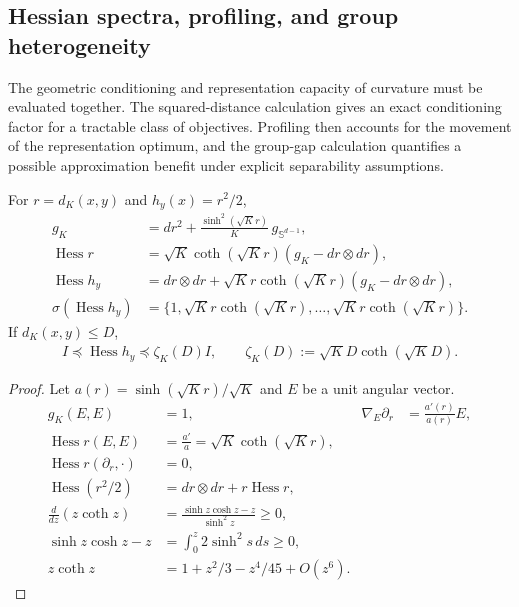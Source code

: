 \subsection{Hessian spectra, profiling, and group heterogeneity}
The geometric conditioning and representation capacity of curvature must be evaluated together. The squared-distance calculation gives an exact conditioning factor for a tractable class of objectives. Profiling then accounts for the movement of the representation optimum, and the group-gap calculation quantifies a possible approximation benefit under explicit separability assumptions.
\begin{proposition}
\label{prop:squared-hessian}
For $r=d_K(x,y)$ and $h_y(x)=r^2/2$,
\begin{align}
 g_K&=dr^2+\frac{\sinh^2(\sqrt Kr)}K\,g_{\mathbb S^{d-1}},\\
 \operatorname{Hess}r
 &=\sqrt K\coth(\sqrt Kr)(g_K-dr\otimes dr),\\
 \operatorname{Hess}h_y
 &=dr\otimes dr+\sqrt Kr\coth(\sqrt Kr)(g_K-dr\otimes dr),\\
 \sigma(\operatorname{Hess}h_y)
 &=\{1,\sqrt Kr\coth(\sqrt Kr),\ldots,\sqrt Kr\coth(\sqrt Kr)\}.
\end{align}
If $d_K(x,y)\le D$,
\begin{align}
 I\preceq\operatorname{Hess}h_y\preceq\zeta_K(D)I,
 \qquad\zeta_K(D):=\sqrt KD\coth(\sqrt KD).
\end{align}
\end{proposition}
\begin{proof}
Let $a(r)=\sinh(\sqrt Kr)/\sqrt K$ and $E$ be a unit angular vector.
\begin{align}
 g_K(E,E)&=1,&\nabla_E\partial_r&=\frac{a'(r)}{a(r)}E,\\
 \operatorname{Hess}r(E,E)&=\frac{a'}a=\sqrt K\coth(\sqrt Kr),\\
 \operatorname{Hess}r(\partial_r,\cdot)&=0,\\
 \operatorname{Hess}(r^2/2)&=dr\otimes dr+r\operatorname{Hess}r,\\
 \frac d{dz}(z\coth z)
 &=\frac{\sinh z\cosh z-z}{\sinh^2z}\ge0,\\
 \sinh z\cosh z-z&=\int_0^z2\sinh^2s\,ds\ge0,\\
 z\coth z&=1+z^2/3-z^4/45+O(z^6).
\end{align}
\end{proof}

